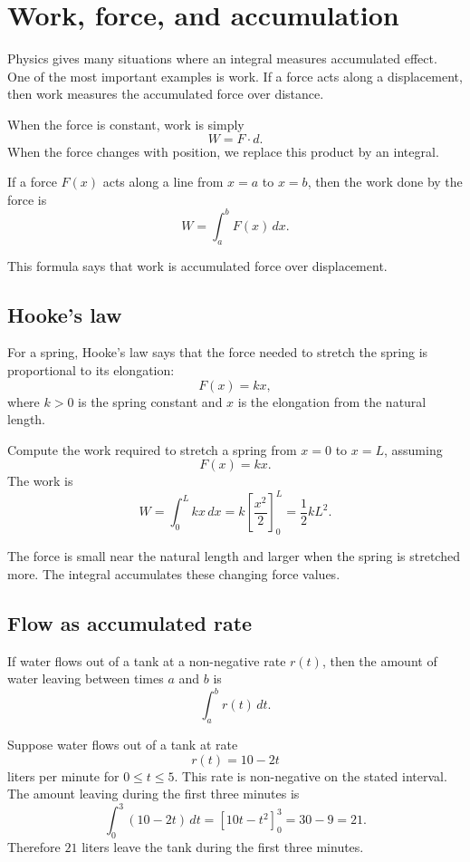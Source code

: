 \section{Work, force, and accumulation}

Physics gives many situations where an integral measures accumulated effect. One of the most important examples is work. If a force acts along a displacement, then work measures the accumulated force over distance.

When the force is constant, work is simply
\[
W=F\cdot d.
\]
When the force changes with position, we replace this product by an integral.

\begin{definitionbox}
If a force \(F(x)\) acts along a line from \(x=a\) to \(x=b\), then the work done by the force is
\[
W=\int_a^b F(x)\,dx.
\]
\end{definitionbox}

This formula says that work is accumulated force over displacement.

\subsection*{Hooke's law}

For a spring, Hooke's law says that the force needed to stretch the spring is proportional to its elongation:
\[
F(x)=kx,
\]
where \(k>0\) is the spring constant and \(x\) is the elongation from the natural length.

\begin{examplebox}
Compute the work required to stretch a spring from \(x=0\) to \(x=L\), assuming
\[
F(x)=kx.
\]
The work is
\[
W=\int_0^L kx\,dx
=k\left[\frac{x^2}{2}\right]_0^L
=\frac12kL^2.
\]
\end{examplebox}

The force is small near the natural length and larger when the spring is stretched more. The integral accumulates these changing force values.

\subsection*{Flow as accumulated rate}

If water flows out of a tank at a non-negative rate \(r(t)\), then the amount of water leaving between times \(a\) and \(b\) is
\[
\int_a^b r(t)\,dt.
\]

\begin{examplebox}
Suppose water flows out of a tank at rate
\[
r(t)=10-2t
\]
liters per minute for \(0\le t\le5\). This rate is non-negative on the stated interval. The amount leaving during the first three minutes is
\[
\int_0^3 (10-2t)\,dt
=\left[10t-t^2\right]_0^3
=30-9=21.
\]
Therefore \(21\) liters leave the tank during the first three minutes.
\end{examplebox}

